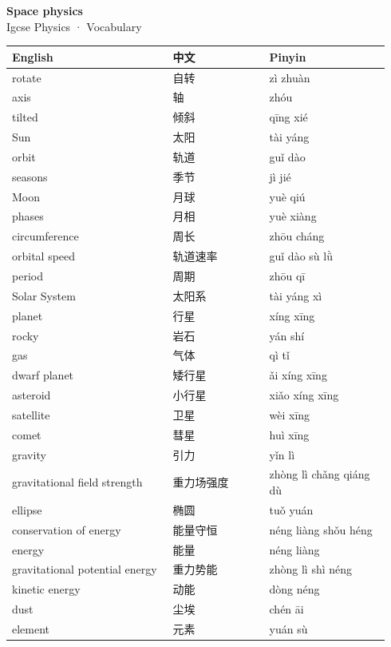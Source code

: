 \documentclass[11pt]{article}
\begin{document}
\begin{center}
  {\LARGE\bfseries Space physics}\\[0.35em]
  {\large Igcse Physics · Vocabulary}
\end{center}
\vspace{0.6em}

\begin{longtable}{@{}p{0.40\linewidth}p{0.24\linewidth}p{0.30\linewidth}@{}}
\toprule
\textbf{English} & \textbf{中文} & \textbf{Pinyin} \\
\midrule
\endhead
\bottomrule
\endlastfoot
rotate & 自转 & zì zhuàn \\
axis & 轴 & zhóu \\
tilted & 倾斜 & qīng xié \\
Sun & 太阳 & tài yáng \\
orbit & 轨道 & guǐ dào \\
seasons & 季节 & jì jié \\
Moon & 月球 & yuè qiú \\
phases & 月相 & yuè xiàng \\
circumference & 周长 & zhōu cháng \\
orbital speed & 轨道速率 & guǐ dào sù lǜ \\
period & 周期 & zhōu qī \\
Solar System & 太阳系 & tài yáng xì \\
planet & 行星 & xíng xīng \\
rocky & 岩石 & yán shí \\
gas & 气体 & qì tǐ \\
dwarf planet & 矮行星 & ǎi xíng xīng \\
asteroid & 小行星 & xiǎo xíng xīng \\
satellite & 卫星 & wèi xīng \\
comet & 彗星 & huì xīng \\
gravity & 引力 & yǐn lì \\
gravitational field strength & 重力场强度 & zhòng lì chǎng qiáng dù \\
ellipse & 椭圆 & tuǒ yuán \\
conservation of energy & 能量守恒 & néng liàng shǒu héng \\
energy & 能量 & néng liàng \\
gravitational potential energy & 重力势能 & zhòng lì shì néng \\
kinetic energy & 动能 & dòng néng \\
dust & 尘埃 & chén āi \\
element & 元素 & yuán sù \\

\end{longtable}
\end{document}
